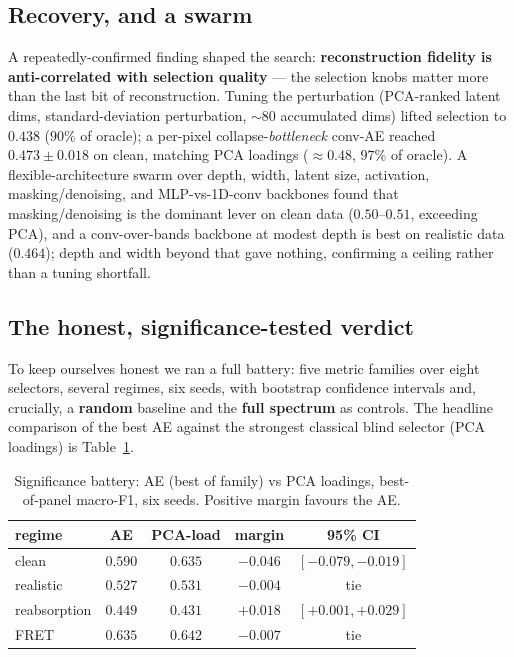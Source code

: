 \documentclass[11pt]{article}
\begin{document}
\subsection{Recovery, and a swarm}
A repeatedly-confirmed finding shaped the search: \textbf{reconstruction fidelity is
anti-correlated with selection quality} --- the selection knobs matter more than the last bit of
reconstruction. Tuning the perturbation (PCA-ranked latent dims, standard-deviation perturbation,
$\sim 80$ accumulated dims) lifted selection to $0.438$ ($90\%$ of oracle); a per-pixel
collapse-\emph{bottleneck} conv-AE reached $\mathbf{0.473 \pm 0.018}$ on clean, matching PCA loadings
($\approx 0.48$, $97\%$ of oracle). A flexible-architecture swarm over depth, width, latent size,
activation, masking/denoising, and MLP-vs-1D-conv backbones found that masking/denoising is the
dominant lever on clean data ($0.50$--$0.51$, exceeding PCA), and a conv-over-bands backbone at
modest depth is best on realistic data ($0.464$); depth and width beyond that gave nothing,
confirming a ceiling rather than a tuning shortfall.

\subsection{The honest, significance-tested verdict}
To keep ourselves honest we ran a full battery: five metric families over eight selectors, several
regimes, six seeds, with bootstrap confidence intervals and, crucially, a \textbf{random} baseline
and the \textbf{full spectrum} as controls. The headline comparison of the best AE against the
strongest classical blind selector (PCA loadings) is Table~\ref{tab:battery}.

\begin{table}[H]\centering
\caption{Significance battery: AE (best of family) vs PCA loadings, best-of-panel macro-F1, six
seeds. Positive margin favours the AE.}
\label{tab:battery}
\small
\begin{tabular}{@{}lcccc@{}}
\toprule
regime & AE & PCA-load & margin & 95\% CI \\
\midrule
clean & $0.590$ & $\mathbf{0.635}$ & $-0.046$ & $[-0.079,-0.019]$ \\
realistic & $0.527$ & $0.531$ & $-0.004$ & tie \\
reabsorption & $\mathbf{0.449}$ & $0.431$ & $+0.018$ & $[+0.001,+0.029]$ \\
FRET & $0.635$ & $0.642$ & $-0.007$ & tie \\
\bottomrule
\end{tabular}
\end{table}
\end{document}
